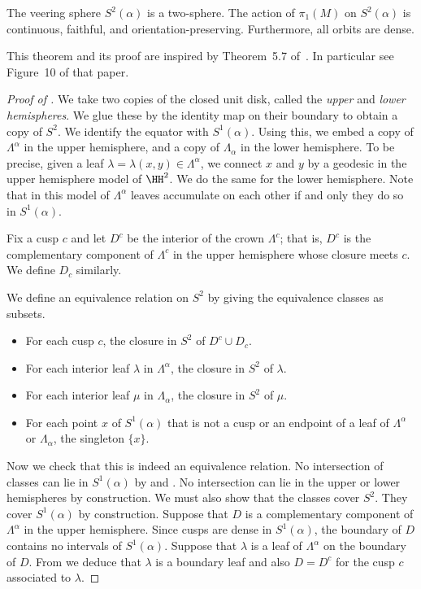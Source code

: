 \documentclass[12pt]{amsart}
\begin{document}
\begin{theorem}
\label{Thm:VeeringSphere}
The veering sphere $S^2(\alpha)$ is a two-sphere.  The action of $\pi_1(M)$ on $S^2(\alpha)$ is continuous, faithful, and orientation-preserving.  Furthermore, all orbits are dense.
\end{theorem}

This theorem and its proof are inspired by Theorem~5.7 of~\cite{Thurston82}. In particular see Figure~10 of that paper.

\begin{proof}[Proof of ]
We take two copies of the closed unit disk, called the \emph{upper} and \emph{lower hemispheres}.  We glue these by the identity map on their boundary to obtain a copy of $S^2$.  We identify the equator with $S^1(\alpha)$.  Using this, we embed a copy of $\Lambda^\alpha$ in the upper hemisphere, and a copy of $\Lambda_\alpha$ in the lower hemisphere.  To be precise, given a leaf $\lambda = \lambda(x,y) \in \Lambda^\alpha$, we connect $x$ and $y$ by a geodesic in the upper hemisphere model of $\HH^2$.  We do the same for the lower hemisphere.  Note that in this model of $\Lambda^\alpha$ leaves accumulate on each other if and only they do so in $S^1(\alpha)$.

Fix a cusp $c$ and let $D^c$ be the interior of the crown $\Lambda^c$; that is, $D^c$ is the complementary component of $\Lambda^c$ in the upper hemisphere whose closure meets $c$.  We define $D_c$ similarly.

We define an equivalence relation on $S^2$ by giving the equivalence classes as subsets.
\begin{itemize}
\item For each cusp $c$, the closure in $S^2$ of $D^c \cup D_c$.
\item For each interior leaf $\lambda$ in $\Lambda^\alpha$, the closure in $S^2$ of $\lambda$.
\item For each interior leaf $\mu$ in $\Lambda_\alpha$, the closure in $S^2$ of $\mu$.
\item For each point $x$ of $S^1(\alpha)$ that is not a cusp or an endpoint of a leaf of $\Lambda^\alpha$ or $\Lambda_\alpha$, the singleton $\{x\}$.
\end{itemize}

Now we check that this is indeed an equivalence relation.  No intersection of classes can lie in $S^1(\alpha)$ by  and .  No intersection can lie in the upper or lower hemispheres by construction.  We must also show that the classes cover $S^2$.  They cover $S^1(\alpha)$ by construction.  Suppose that $D$ is a complementary component of $\Lambda^\alpha$ in the upper hemisphere.  Since cusps are dense in $S^1(\alpha)$, the boundary of $D$ contains no intervals of $S^1(\alpha)$.  Suppose that $\lambda$ is a leaf of $\Lambda^\alpha$ on the boundary of $D$.  From  we deduce that $\lambda$ is a boundary leaf and also $D = D^c$ for the cusp $c$ associated to $\lambda$. 


\end{proof}
\end{document}
